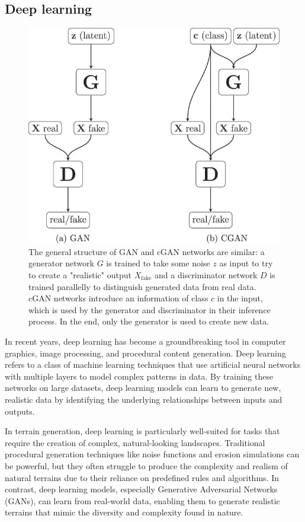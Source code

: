 \subsection{Deep learning}

\begin{figure}[ht]
	\centering
	\includegraphics{schemaGAN_cGAN.jpg}
    \caption{The general structure of GAN and cGAN networks are similar: a generator network $G$ is trained to take some noise $z$ as input to try to create a "realistic" output $X_{\text{fake}}$ and a discriminator network $D$ is trained parallelly to distinguish generated data from real data. cGAN networks introduce an information of class $c$ in the input, which is used by the generator and discriminator in their inference process. In the end, only the generator is used to create new data. }
    \label{fig:coral-island_GAN-scheme}
\end{figure}

In recent years, deep learning has become a groundbreaking tool in computer graphics, image processing, and procedural content generation. Deep learning refers to a class of machine learning techniques that use artificial neural networks with multiple layers to model complex patterns in data. By training these networks on large datasets, deep learning models can learn to generate new, realistic data by identifying the underlying relationships between inputs and outputs.

In terrain generation, deep learning is particularly well-suited for tasks that require the creation of complex, natural-looking landscapes. Traditional procedural generation techniques like noise functions and erosion simulations can be powerful, but they often struggle to produce the complexity and realism of natural terrains due to their reliance on predefined rules and algorithms. In contrast, deep learning models, especially Generative Adversarial Networks (GANs), can learn from real-world data, enabling them to generate realistic terrains that mimic the diversity and complexity found in nature.

